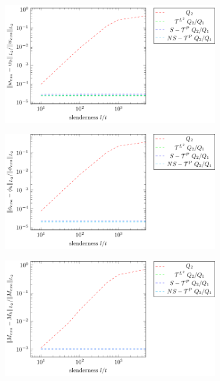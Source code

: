 \begin{figure}
    \centering
    \begin{subfigure}[b]{0.49\linewidth}        %
        \centering
        \includegraphics[width=\linewidth]{slenderness_w}
        \caption{}
        \vspace*{2mm}
    \end{subfigure}
    \begin{subfigure}[b]{0.49\linewidth}        %
        \centering
        \includegraphics[width=\linewidth]{slenderness_phi}
        \caption{}
        \vspace*{2mm}
    \end{subfigure}
    \begin{subfigure}[b]{0.49\linewidth}        %
        \centering
        \includegraphics[width=\linewidth]{slenderness_M}

\end{subfigure}
\end{figure}
